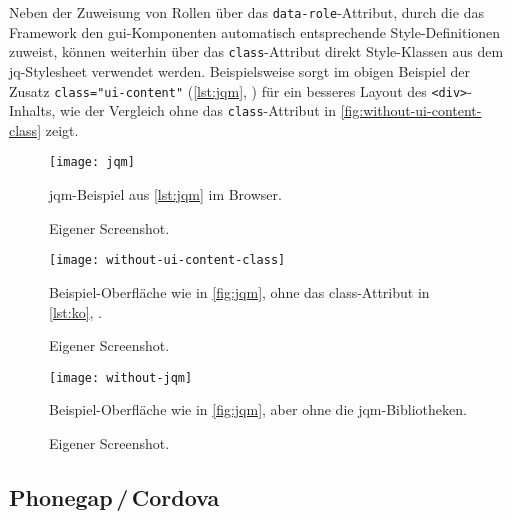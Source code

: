 Neben der Zuweisung von Rollen über das \lstinline|data-role|-Attribut, durch die das Framework den \gls{gui}-Komponenten automatisch entsprechende Style-Definitionen zuweist, können weiterhin über das \lstinline|class|-Attribut direkt Style-Klassen aus dem \gls{jq}-Stylesheet verwendet werden.
Beispielsweise sorgt im obigen Beispiel der Zusatz \lstinline|class="ui-content"| (\autoref{lst:jqm}, ) für ein besseres Layout des \lstinline|<div>|-Inhalts, wie der Vergleich ohne das \lstinline|class|-Attribut in \autoref{fig:without-ui-content-class} zeigt.

\begin{figure}[h!]
\centering
	\texttt{[image: jqm]}
	\caption[\gls{jqm}-Beispiel]{\gls{jqm}-Beispiel aus \autoref{lst:jqm} im Browser.}
	\label{fig:jqm}
	\imagesourcefont
	\vspace{\imagesourcespace}
	\imagesourcefont{}
	\caption*{\imagesourcelabel Eigener Screenshot.}
\end{figure}

\begin{figure}[h!]
\centering
\texttt{[image: without-ui-content-class]}
	\caption[Beispiel ohne class-Attribut]{Beispiel-Oberfläche wie in \autoref{fig:jqm}, ohne das class-Attribut in \autoref{lst:ko}, .}
	\label{fig:without-ui-content-class}
	\imagesourcefont
	\vspace{\imagesourcespace}
	\imagesourcefont{}
	\caption*{\imagesourcelabel Eigener Screenshot.}
\end{figure}

\begin{figure}[h!]
\centering
\texttt{[image: without-jqm]}
	\caption[Beispiel ohne \gls{jqm}]{Beispiel-Oberfläche wie in \autoref{fig:jqm}, aber ohne die \gls{jqm}-Bibliotheken.}
	\label{fig:without-jqm}
	\imagesourcefont
	\vspace{\imagesourcespace}
	\imagesourcefont{}
	\caption*{\imagesourcelabel Eigener Screenshot.}
\end{figure}

\subsection{Phonegap\,/\,Cordova} \label{sec:cordova}


